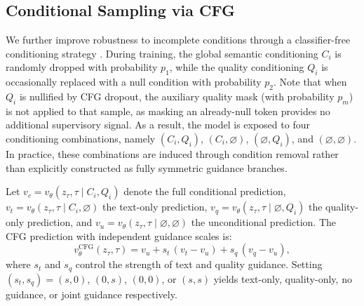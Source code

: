 \documentclass[lettersize,journal]{IEEEtran}
\begin{document}
\subsection{Conditional Sampling via CFG}
We further improve robustness to incomplete conditions through a classifier-free conditioning strategy \cite{ho2022classifier}. During training, the global semantic conditioning $C_i$ is randomly dropped with probability $p_{1}$, while the quality conditioning $Q_i$ is occasionally replaced with a null condition with probability $p_{2}$. Note that when $Q_i$ is nullified by CFG dropout, the auxiliary quality mask (with probability $p_m$) is not applied to that sample, as masking an already-null token provides no additional supervisory signal. As a result, the model is exposed to four conditioning combinations, namely $(C_i, Q_i)$, $(C_i,\varnothing)$, $(\varnothing, Q_i)$, and $(\varnothing, \varnothing)$. In practice, these combinations are induced through condition removal rather than explicitly constructed as fully symmetric guidance branches.

Let $v_c = v_\theta(z_\tau, \tau \mid C_i, Q_i)$ denote the full conditional prediction, $v_t = v_\theta(z_\tau, \tau \mid C_i, \varnothing)$ the text-only prediction, $v_q = v_\theta(z_\tau, \tau \mid \varnothing, Q_i)$ the quality-only prediction, and $v_u = v_\theta(z_\tau, \tau \mid \varnothing, \varnothing)$ the unconditional prediction. The CFG prediction with independent guidance scales is:
  \begin{equation}
  v_\theta^{\text{CFG}}(z_\tau, \tau) =
  v_u + s_t \, (v_t - v_u) + s_q \, (v_q - v_u),
  \end{equation}
where $s_t$ and $s_q$ control the strength of text and quality guidance. Setting $(s_t, s_q) = (s, 0)$, $(0, s)$, $(0, 0)$, or $(s, s)$ yields text-only, quality-only, no guidance, or joint guidance respectively.
\end{document}
